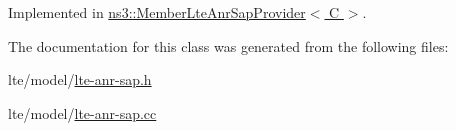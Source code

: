 Implemented in \hyperlink{classns3_1_1MemberLteAnrSapProvider_ac062917c3fbc247ab2d6c716972f9f89}{ns3\+::\+Member\+Lte\+Anr\+Sap\+Provider$<$ C $>$}.



The documentation for this class was generated from the following files\+:\begin{DoxyCompactItemize}
\item 
lte/model/\hyperlink{lte-anr-sap_8h}{lte-\/anr-\/sap.\+h}\item 
lte/model/\hyperlink{lte-anr-sap_8cc}{lte-\/anr-\/sap.\+cc}\end{DoxyCompactItemize}
